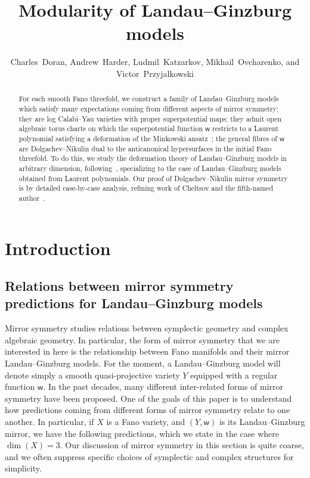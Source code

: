 \documentclass[10pt]{amsart}
\title{Modularity of Landau--Ginzburg models}
\author[Doran, Harder, Katzarkov, Ovcharenko, and Przyjalkowski]{Charles~Doran, Andrew~Harder, Ludmil~Katzarkov, Mikhail~Ovcharenko, and Victor~Przyjalkowski}
\date{}
\numberwithin{equation}{section}
\theoremstyle{plain}
\theoremstyle{definition}
\theoremstyle{remark}
\begin{document}
\begin{abstract}
  For each smooth Fano threefold, we construct a family of Landau--Ginzburg models which satisfy many expectations coming from different aspects of mirror symmetry; they are log Calabi--Yau varieties with proper superpotential maps; they admit open algebraic torus charts on which the superpotential function \(\mathsf{w}\) restricts to a Laurent polynomial satisfying a deformation of the Minkowski ansatz~\cite{akhtar2012minkowski}; the general fibres of \(\mathsf{w}\) are Dolgachev--Nikulin dual to the anticanonical hypersurfaces in the initial Fano threefold. To do this, we study the deformation theory of Landau--Ginzburg models in arbitrary dimension, following~\cite{katzarkov2017bogomolov}, specializing to the case of Landau--Ginzburg models obtained from Laurent polynomials. Our proof of Dolgachev--Nikulin mirror symmetry is by detailed case-by-case analysis, refining work of Cheltsov and the fifth-named author~\cite{cheltsov2018katzarkov}.
\end{abstract}

\maketitle

\section{Introduction}

\subsection{Relations between mirror symmetry predictions for Landau--Ginzburg models}

Mirror symmetry studies relations between symplectic geometry and complex algebraic geometry. In particular, the form of mirror symmetry that we are interested in here is the relationship between Fano manifolds and their mirror Landau--Ginzburg models. For the moment, a Landau--Ginzburg model will denote simply a smooth quasi-projective variety \(Y\) equipped with a regular function \(\mathsf{w}\). In the past decades, many different inter-related forms of mirror symmetry have been proposed. One of the goals of this paper is to understand how predictions coming from different forms of mirror symmetry relate to one another. In particular, if \(X\) is a Fano variety, and \((Y,\mathsf{w})\) is its Landau--Ginzburg mirror, we have the following predictions, which we state in the case where \(\dim(X) = 3\). Our discussion of mirror symmetry in this section is quite coarse, and we often suppress specific choices of symplectic and complex structures for simplicity.
\end{document}
